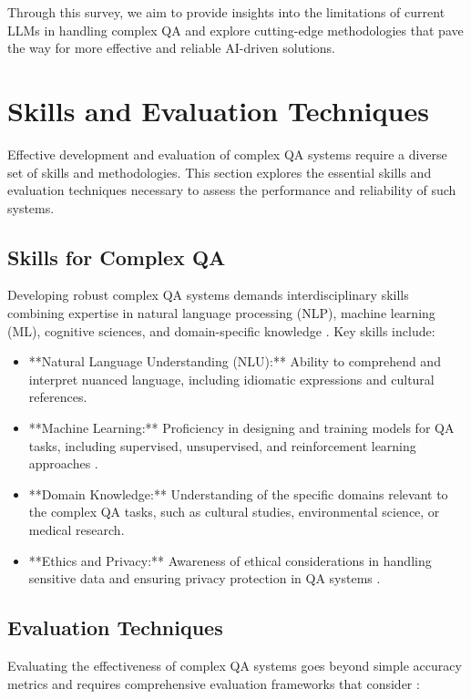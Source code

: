 \documentclass[a4paper,12pt]{article}
\begin{document}
Through this survey, we aim to provide insights into the limitations of current LLMs in handling complex QA and explore cutting-edge methodologies that pave the way for more effective and reliable AI-driven solutions.

\section{Skills and Evaluation Techniques}
\label{sec:skills_evaluation}

Effective development and evaluation of complex QA systems require a diverse set of skills and methodologies. This section explores the essential skills and evaluation techniques necessary to assess the performance and reliability of such systems.

\subsection{Skills for Complex QA}

Developing robust complex QA systems demands interdisciplinary skills combining expertise in natural language processing (NLP), machine learning (ML), cognitive sciences, and domain-specific knowledge \cite{knowledge_graphs_paper}. Key skills include:

\begin{itemize}
    \item **Natural Language Understanding (NLU):** Ability to comprehend and interpret nuanced language, including idiomatic expressions and cultural references.
    \item **Machine Learning:** Proficiency in designing and training models for QA tasks, including supervised, unsupervised, and reinforcement learning approaches \cite{transformers_paper}.
    \item **Domain Knowledge:** Understanding of the specific domains relevant to the complex QA tasks, such as cultural studies, environmental science, or medical research.
    \item **Ethics and Privacy:** Awareness of ethical considerations in handling sensitive data and ensuring privacy protection in QA systems \cite{explainable_ai_paper}.
\end{itemize}

\subsection{Evaluation Techniques}

Evaluating the effectiveness of complex QA systems goes beyond simple accuracy metrics and requires comprehensive evaluation frameworks that consider \cite{explainable_ai_paper}:
\end{document}
